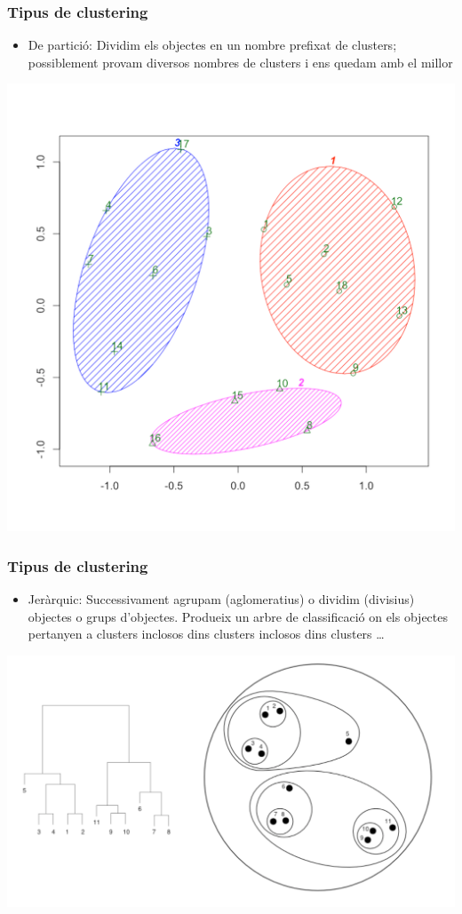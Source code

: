 \documentclass[12pt,t]{beamer}
\renewcommand{\emph}[1]{{\color{red}#1}}
\theoremstyle{plain}
\theoremstyle{definition}
\begin{document}
\begin{frame}
\frametitle{Tipus de clustering}

\begin{itemize}
\item \emph{De partició:} Dividim els objectes en un nombre prefixat de clusters; possiblement provam diversos nombres de clusters i ens quedam amb el millor 
\end{itemize}
\vspace*{-2ex}

\begin{center}
\includegraphics[width=0.65\linewidth]{Rplot7.pdf}
\end{center}




\end{frame}



\begin{frame}
\frametitle{Tipus de clustering}

\begin{itemize}
\item \emph{Jeràrquic}: Successivament agrupam (\emph{aglomeratius}) o dividim (\emph{divisius}) objectes o grups d'objectes. Produeix un arbre de classificació on els objectes pertanyen a clusters inclosos dins clusters inclosos dins clusters \ldots
\end{itemize}
\begin{center}
\includegraphics[width=0.7\linewidth]{hclust-example}
\end{center}




\end{frame}
\end{document}
